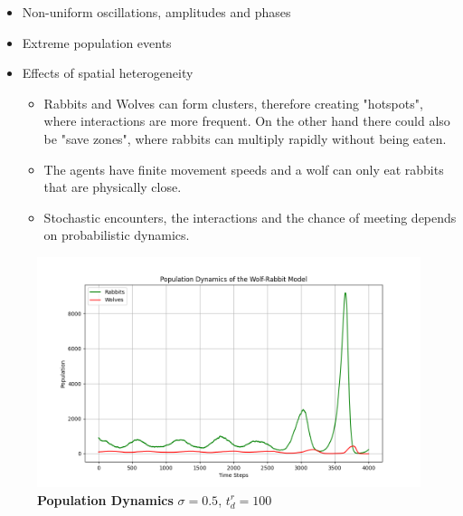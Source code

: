 \begin{itemize}
	\item Non-uniform oscillations, amplitudes and phases
	\item Extreme population events
	\item Effects of spatial heterogeneity
		\begin{itemize}
			\item Rabbits and Wolves can form clusters, therefore creating "hotspots", where interactions are more frequent. On the other hand there could also be "save zones", where rabbits can multiply rapidly without being eaten.
			\item The agents have finite movement speeds and a wolf can only eat rabbits that are physically close.
			\item Stochastic encounters, the interactions and the chance of meeting depends on probabilistic dynamics.
		\end{itemize}
\end{itemize}
\begin{figure}[H]
	\centering
	\includegraphics[width=\textwidth]{media/population_dynamics_ex01.png}
	\caption{
		\textbf{Population Dynamics}
		$\sigma = 0.5$, $t_d^r = 100$
	}
	\label{fig:ex01}
\end{figure}

